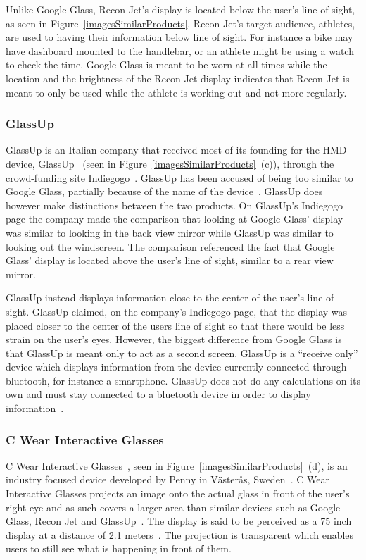 Unlike Google Glass, Recon Jet's display is located below the user's line of sight, as seen in Figure~\ref{imagesSimilarProducts}. Recon Jet's target audience, athletes, are used to having their information below line of sight. For instance a bike may have dashboard mounted to the handlebar, or an athlete might be using a watch to check the time. Google Glass is meant to be worn at all times while the location and the brightness of the Recon Jet display indicates that Recon Jet is meant to only be used while the athlete is working out and not more regularly.

\subsubsection{GlassUp}

GlassUp is an Italian company that received most of its founding for the HMD device, GlassUp~\cite{glassUp} (seen in Figure~\ref{imagesSimilarProducts}~(c)), through the crowd-funding site Indiegogo~\cite{glassUpIndiegogo}. GlassUp has been accused of being too similar to Google Glass, partially because of the name of the device~\cite{glassUpLegal}. GlassUp does however make distinctions between the two products. On GlassUp's Indiegogo page the company made the comparison that looking at Google Glass' display was similar to looking in the back view mirror while GlassUp was similar to looking out the windscreen. The comparison referenced the fact that Google Glass' display is located above the user's line of sight, similar to a rear view mirror.

GlassUp instead displays information close to the center of the user's line of sight. GlassUp claimed, on the company's Indiegogo page, that the display was placed closer to the center of the users line of sight so that there would be less strain on the user's eyes. However, the biggest difference from Google Glass is that GlassUp is meant only to act as a second screen. GlassUp is a ``receive only'' device which displays information from the device currently connected through bluetooth, for instance a smartphone. GlassUp does not do any calculations on its own and must stay connected to a bluetooth device in order to display information~\cite{glassUpIndiegogo}.

\subsubsection{C Wear Interactive Glasses}

C Wear Interactive Glasses~\cite{penny}, seen in Figure~\ref{imagesSimilarProducts}~(d), is an industry focused device developed by Penny in V{\"a}ster{\aa}s, Sweden~\cite{pennyCompany}. C Wear Interactive Glasses projects an image onto the actual glass in front of the user's right eye and as such covers a larger area than similar devices such as Google Glass, Recon Jet and GlassUp~\cite{pennyDisplay}. The display is said to be perceived as a 75 inch display at a distance of 2.1 meters~\cite{pennyProducts}. The projection is transparent which enables users to still see what is happening in front of them.

